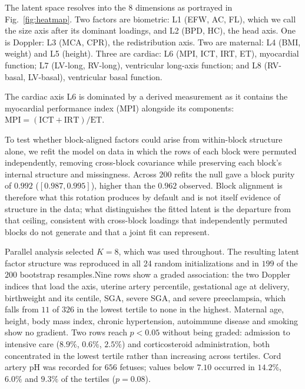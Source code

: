 \documentclass[a4paper,fleqn]{cas-sc}
\begin{document}
The latent space resolves into the 8 dimensions as portrayed in Fig.~\ref{fig:heatmap}. Two factors are biometric: L1 (EFW, AC, FL), which we call the size axis after its dominant loadings, and L2 (BPD, HC), the head axis. One is Doppler: L3 (MCA, CPR), the redistribution axis. Two are maternal: L4 (BMI, weight) and L5 (height). Three are cardiac: L6 (MPI, ICT, IRT, ET), myocardial function; L7 (LV-long, RV-long), ventricular long-axis function; and L8 (RV-basal, LV-basal), ventricular basal function.

The cardiac axis L6 is dominated by a derived measurement as it contains the myocardial performance index (MPI) alongside its components: $\mathrm{MPI}=(\mathrm{ICT}+\mathrm{IRT})/\mathrm{ET}$. 

To test whether block-aligned factors could arise from within-block structure alone, we refit the model on data in which the rows of each block were permuted independently, removing cross-block covariance while preserving each block's internal structure and missingness. Across $200$ refits the null gave a block purity of $0.992$ ($[0.987, 0.995]$), higher than the $0.962$ observed. Block alignment is therefore what this rotation produces by default and is not itself evidence of structure in the data; what distinguishes the fitted latent is the departure from that ceiling, consistent with cross-block loadings that independently permuted blocks do not generate and that a joint fit can represent.

Parallel analysis selected $K=8$, which was used throughout. The resulting latent factor structure was reproduced in all 24 random initializations and in $199$ of the $200$ bootstrap resamples.Nine rows show a graded association: the two Doppler indices that load the axis, uterine artery percentile,
gestational age at delivery, birthweight and its centile, SGA, severe SGA, and severe preeclampsia, which
falls from $11$ of $326$ in the lowest tertile to none in the highest. Maternal age, height, body mass
index, chronic hypertension, autoimmune disease and smoking show no gradient. Two rows reach $p<0.05$
without being graded: admission to intensive care ($8.9\%$, $0.6\%$, $2.5\%$) and corticosteroid
administration, both concentrated in the lowest tertile rather than increasing across tertiles. Cord artery
pH was recorded for $656$ fetuses; values below $7.10$ occurred in $14.2\%$, $6.0\%$ and $9.3\%$ of the
tertiles ($p=0.08$).
\end{document}
